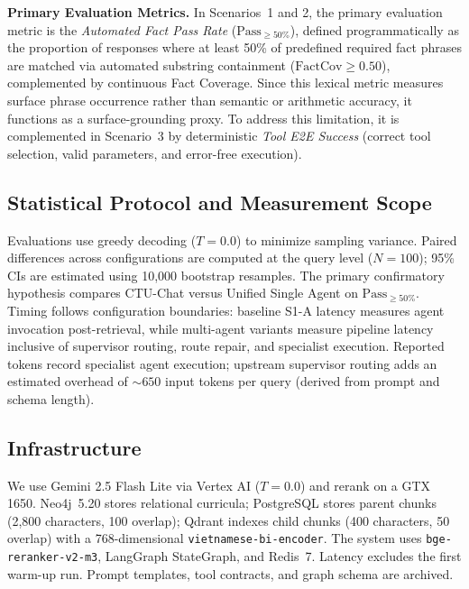 \textbf{Primary Evaluation Metrics.} In Scenarios~1 and 2, the primary evaluation metric is the \emph{Automated Fact Pass Rate} ($\text{Pass}_{\ge 50\%}$), defined programmatically as the proportion of responses where at least 50\% of predefined required fact phrases are matched via automated substring containment ($\text{FactCov} \ge 0.50$), complemented by continuous Fact Coverage. Since this lexical metric measures surface phrase occurrence rather than semantic or arithmetic accuracy, it functions as a surface-grounding proxy. To address this limitation, it is complemented in Scenario~3 by deterministic \emph{Tool E2E Success} (correct tool selection, valid parameters, and error-free execution).

\subsection{Statistical Protocol and Measurement Scope}
\label{sec:statistics}

Evaluations use greedy decoding ($T{=}0.0$) to minimize sampling variance. Paired differences across configurations are computed at the query level ($N{=}100$); 95\% CIs are estimated using 10,000 bootstrap resamples. The primary confirmatory hypothesis compares CTU-Chat versus Unified Single Agent on $\text{Pass}_{\ge 50\%}$. Timing follows configuration boundaries: baseline S1-A latency measures agent invocation post-retrieval, while multi-agent variants measure pipeline latency inclusive of supervisor routing, route repair, and specialist execution. Reported tokens record specialist agent execution; upstream supervisor routing adds an estimated overhead of ${\sim}650$ input tokens per query (derived from prompt and schema length).

\subsection{Infrastructure}
\label{sec:infrastructure}

We use Gemini 2.5 Flash Lite via Vertex AI ($T{=}0.0$) and rerank on a GTX 1650. Neo4j~5.20 stores relational curricula; PostgreSQL stores parent chunks (2,800 characters, 100 overlap); Qdrant indexes child chunks (400 characters, 50 overlap) with a 768-dimensional \texttt{vietnamese-bi-encoder}. The system uses \texttt{bge-reranker-v2-m3}, LangGraph StateGraph, and Redis~7. Latency excludes the first warm-up run. Prompt templates, tool contracts, and graph schema are archived.
